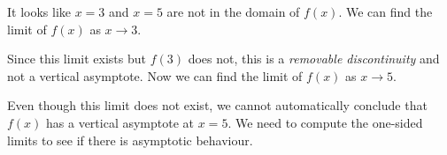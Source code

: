 \noindent
It looks like $x=3$ and $x=5$ are not in the domain of $f(x)$. We can find the limit of $f(x)$ as $x \rightarrow 3$.

\begin{maplegroup}
\begin{mapleinput}
\end{mapleinput}
\mapleresult
\begin{maplelatex}
\end{maplelatex}
\end{maplegroup}

\noindent
Since this limit exists but $f(3)$ does not, this is a \textit{removable discontinuity} and not a vertical asymptote. Now we can find the limit of $f(x)$ as $x \rightarrow 5$.

\begin{maplegroup}
\begin{mapleinput}
\end{mapleinput}
\mapleresult
\begin{maplelatex}
\end{maplelatex}
\end{maplegroup}

\noindent
Even though this limit does not exist, we cannot automatically conclude that $f(x)$ has a vertical asymptote at $x=5$. We need to compute the one-sided limits to see if there is asymptotic behaviour.

\begin{maplegroup}
\begin{mapleinput}
\end{mapleinput}
\begin{mapleinput}
\end{mapleinput}
\mapleresult
\begin{maplelatex}
\end{maplelatex}
\mapleresult
\begin{maplelatex}
\end{maplelatex}
\end{maplegroup}

